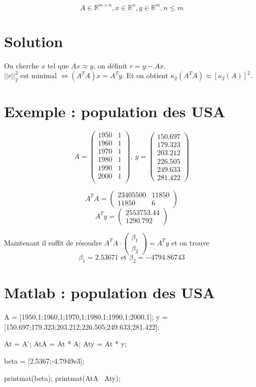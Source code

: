 \documentclass[11pt,a4paper]{report}
\newcommand{\matdd}[2]{\begin{pmatrix}#1 \\ #2\end{pmatrix}}
\begin{document}
$$
A \in \mathbb{R}^{m\times n}, x \in \mathbb{R}^n, y \in \mathbb{R}^m, n \leq m
$$

\section{Solution}

On cherche $x$ tel que $Ax \approx y$, on définit $r = y - Ax$. $||r||^2_2 \text{ est minimal } \Longleftrightarrow (A^T A)x = A^T y$. Et on obtient $\kappa_2(A^T A) \approx [\kappa_2(A)]^2$.

\section{Exemple : population des USA}

$$
A = \begin{pmatrix}
1950 & 1 \\
1960 & 1 \\
1970 & 1 \\
1980 & 1 \\
1990 & 1 \\
2000 & 1 \\
\end{pmatrix}, \ 
y = \begin{pmatrix}
150.697 \\
179.323 \\
203.212 \\
226.505 \\
249.633 \\
281.422
\end{pmatrix}
$$

$$
A^T A = \begin{pmatrix}
23405500 & 11850 \\
11850 & 6
\end{pmatrix}
$$
$$
A^T y = \begin{pmatrix}
2553753.44 \\
1290.792
\end{pmatrix}
$$

Maintenant il suffit de résoudre $A^T A \cdot \matdd{\beta_1}{\beta_2} = A^T y$ et on trouve $$\beta_1 = 2.53671 \text{ et } \beta_2 = -4794.86743$$

\section{Matlab : population des USA}
\begin{matlabcode}
A = [1950,1;1960,1;1970,1;1980,1;1990,1;2000,1];
y = [150.697;179.323;203.212;226.505;249.633;281.422];

At = A';
AtA = At * A;
Aty = At * y;

beta = [2.5367;-4.7949e3];

printmat(beta);
printmat(AtA \ Aty);
\end{matlabcode}
\end{document}
